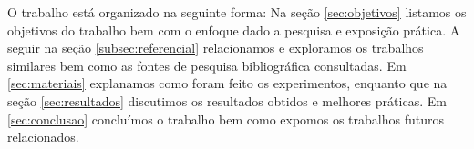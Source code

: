 O trabalho está organizado na seguinte forma: Na seção \ref{sec:objetivos} listamos os objetivos do trabalho bem com o enfoque dado a pesquisa e exposição prática. A seguir na seção \ref{subsec:referencial} relacionamos e exploramos os trabalhos similares bem como as fontes de pesquisa bibliográfica consultadas. Em \ref{sec:materiais} explanamos como foram feito os experimentos, enquanto que na seção \ref{sec:resultados} discutimos os resultados obtidos e melhores práticas. Em \ref{sec:conclusao} concluímos o trabalho bem como expomos os trabalhos futuros relacionados.

